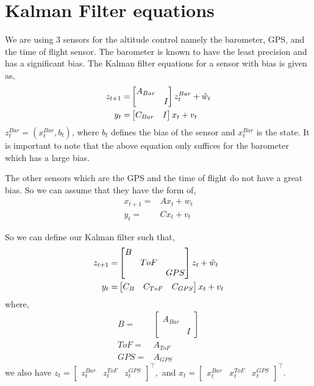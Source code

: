 \documentclass{article}
\begin{document}
\section{Kalman Filter equations}
We are using 3 sensors for the altitude control namely the barometer, GPS, and the time of flight sensor. The barometer is known to have the least precision and has a significant bias. The Kalman filter equations for a sensor with bias is given as,
\begin{align}
    z_{t+1}=&\begin{bmatrix}
        A_{Bar}&\\
        &I
    \end{bmatrix}
        z_t^{Bar}
    +
        \Tilde{w}_t \\
    y_t=&\begin{bmatrix}
        C_{Bar}&I
    \end{bmatrix}
        x_t+v_t
\end{align}
$z_t^{Bar}=(x_t^{Bar},b_t)$, where $b_t$ defines the bias of the sensor and $x_t^{Bar}$ is the state. It is important to note that the above equation only suffices for the barometer which has a large bias. 

The other sensors which are the GPS and the time of flight do not have a great bias. So we can assume that they have the form of,
\begin{align}
    x_{t+1}=&Ax_t+w_t\\
    y_t=&Cx_t+v_t
\end{align}

So we can define our Kalman filter such that,
\begin{align}
    z_{t+1}=&\begin{bmatrix}
        B&&\\
        &ToF&\\
        &&GPS
    \end{bmatrix}z_t+\Tilde{w}_t \\
    y_t=&\begin{bmatrix}
        C_B&C_{ToF}&C_{GPS}
    \end{bmatrix}
        x_t+v_t
\end{align}
where,
\begin{align}
    B=&\begin{bmatrix}
        A_{Bar}&\\
        &I
    \end{bmatrix}\\
    ToF=&A_{ToF}\\
    GPS=&A_{GPS}
\end{align}
we also have $z_t=\begin{bmatrix}
   z_t^{Bar}&z_t^{ToF}&z_t^{GPS} 
\end{bmatrix}^\intercal,$  and $x_t=\begin{bmatrix}
    x_t^{Bar}&x_t^{ToF}&x_t^{GPS}
\end{bmatrix}^\intercal.$
\end{document}
